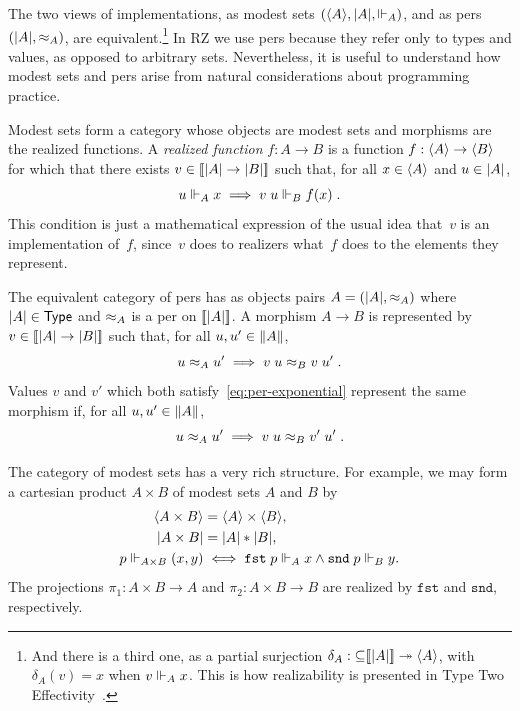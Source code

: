 The two views of implementations, as modest sets $(\langle A \rangle,
|A|, {\Vdash_A})$, and as pers $(|A|, {\approx_A})$, are
equivalent.\footnote{And there is a third one, as a partial surjection
  $\delta_A : {\subseteq}[\![|A|]\!] \twoheadrightarrow \langle A \rangle$, with
  $\delta_A(v) = x$ when $v \Vdash_A x$. This is how realizability is
  presented in Type Two Effectivity~\cite{Wei00}.} In RZ we use pers
because they refer only to types and values, as opposed to arbitrary
sets. Nevertheless, it is useful to understand how modest sets and
pers arise from natural considerations about programming practice.

Modest sets form a category whose objects are modest sets and
morphisms are the realized functions. A \emph{realized function} $f :
A \to B$ is a function $f : \langle A \rangle \to \langle B \rangle$ for which that there
exists $v \in [\![|A| \to |B|]\!]$ such that, for all
$x \in \langle A \rangle$ and $u \in |A|$,
%
\begin{equation}
  \label{eq:rz-function-space}
  u \Vdash_A x \implies v\;u \Vdash_B f(x) \;.
\end{equation}
%
This condition is just a mathematical expression of the usual idea
that~$v$ is an implementation of~$f$, since~$v$ does to realizers
what~$f$ does to the elements they represent.

The equivalent category of pers has as objects pairs $A = (|A|,
{\approx_A})$ where $|A| \in \mathsf{Type}$ and $\approx_A$ is a per on
$[\![|A|]\!]$. A morphism $A \to B$ is represented by $v
\in [\![|A| \to |B|]\!]$ such that, for all $u, u'
\in \|A\|$,
%
\begin{equation}
  \label{eq:per-exponential}
  u \approx_A u' \implies v\;u \approx_B v\;u' \;.
\end{equation}
%
Values $v$ and $v'$ which both satisfy~\eqref{eq:per-exponential}
represent the same morphism if, for all $u, u' \in \|A\|$,
%
\begin{equation*}
  u \approx_A u' \implies v\;u \approx_B v'\;u' \;.
\end{equation*}

The category of modest sets has a very rich structure. For example, we
may form a cartesian product $A \times B$ of modest sets $A$ and $B$
by
%
\begin{align*}
  \langle A \times B \rangle &= \langle A \rangle \times \langle B \rangle,\\
  |A \times B| &= |A| * |B|,\\
  p \Vdash_{A \times B} (x,y) &\iff
  \mathtt{fst}\;p \Vdash_A x \land \mathtt{snd}\;p \Vdash_B y.
\end{align*}
%
The projections $\pi_1 : A \times B \to A$ and $\pi_2 : A \times B \to
B$ are realized by $\mathtt{fst}$ and $\mathtt{snd}$, respectively.

